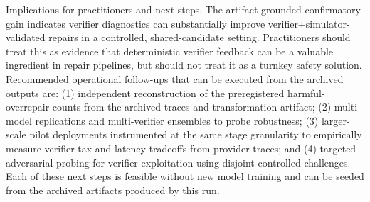 \documentclass[conference]{IEEEtran}
\begin{document}
Implications for practitioners and next steps. The artifact-grounded confirmatory gain indicates verifier diagnostics can substantially improve verifier+simulator-validated repairs in a controlled, shared-candidate setting. Practitioners should treat this as evidence that deterministic verifier feedback can be a valuable ingredient in repair pipelines, but should not treat it as a turnkey safety solution. Recommended operational follow-ups that can be executed from the archived outputs are: (1) independent reconstruction of the preregistered harmful-overrepair counts from the archived traces and transformation artifact; (2) multi-model replications and multi-verifier ensembles to probe robustness; (3) larger-scale pilot deployments instrumented at the same stage granularity to empirically measure verifier tax and latency tradeoffs from provider traces; and (4) targeted adversarial probing for verifier-exploitation using disjoint controlled challenges. Each of these next steps is feasible without new model training and can be seeded from the archived artifacts produced by this run.
\end{document}
